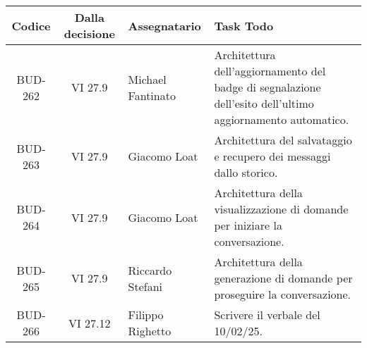 \clearpage
\begin{table}[htbp]
    \centering
    \begin{tabular}{|c|c|p{}|p{}|}
        \hline
        \rowcolor[gray]{0.75}
        \textbf{Codice} & \textbf{Dalla decisione} & \textbf{Assegnatario} & \textbf{Task Todo} \\
        \hline
        BUD-262 & VI 27.9 & Michael Fantinato & Architettura dell'aggiornamento del badge di segnalazione dell'esito dell'ultimo aggiornamento automatico. \\
        \hline
        BUD-263 & VI 27.9 & Giacomo Loat & Architettura del salvataggio e recupero dei messaggi dallo storico. \\
        \hline
        BUD-264 & VI 27.9 & Giacomo Loat & Architettura della visualizzazione di domande per iniziare la conversazione. \\
        \hline
        BUD-265 & VI 27.9 & Riccardo Stefani & Architettura della generazione di domande per proseguire la conversazione. \\
        \hline
        BUD-266 & VI 27.12 & Filippo Righetto & Scrivere il verbale del 10/02/25. \\
        \hline
    \end{tabular}
    \end{table}